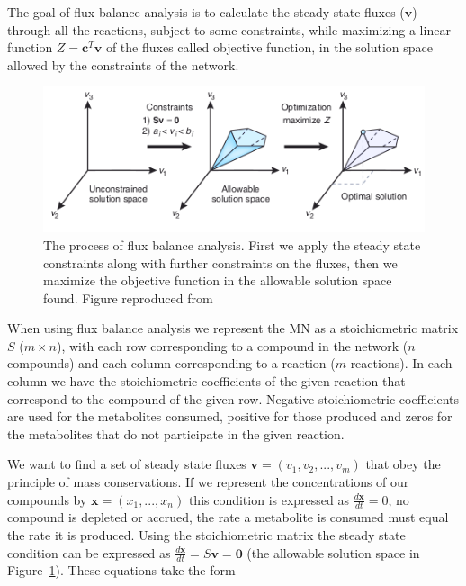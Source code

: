 \documentclass[a4paper,12pt]{article}
\begin{document}
	The goal of flux balance analysis is to calculate the steady state fluxes ($\mathbf{v}$) through all the reactions, subject to some constraints, while maximizing a linear function $Z=\mathbf{c}^T \mathbf{v}$ of the fluxes called objective function, in the solution space allowed by the constraints of the network.

	\begin{figure}[htpb]
		\centering
		\includegraphics[width=0.8\linewidth]{fba_frompaper.png}
		\caption{The process of flux balance analysis. First we apply the steady state constraints along with further constraints on the fluxes, then we maximize the objective function in the allowable solution space found. Figure reproduced from \cite[]{whatisfluxbalance} }
		\label{fig:fluxbalance}
	\end{figure}

	When using flux balance analysis we represent the MN as a stoichiometric matrix $S$ ($m\times n$), with each row corresponding to a compound in the network ($n$ compounds) and each column corresponding to a reaction ($m$ reactions). In each column we have the stoichiometric coefficients of the given reaction that correspond to the compound of the given row. Negative stoichiometric coefficients are used for the metabolites consumed, positive for those produced and zeros for the metabolites that do not participate in the given reaction.
	
	We want to find a set of steady state fluxes $\mathbf{v}=\left( v_1,v_2,...,v_m \right)$ that obey the principle of mass conservations. If we represent the concentrations of our compounds by ${\mathbf{x}=\left( x_1, ... , x_n \right)}$ this condition is expressed as $\frac{d\mathbf{x}}{dt}=0$, no compound is depleted or accrued, the rate a metabolite is consumed must equal the rate it is produced. Using the stoichiometric matrix the steady state condition can be expressed as $\frac{d\mathbf{x}}{dt}= S\mathbf{v}=\mathbf{0}$ (the allowable solution space in Figure~\ref{fig:fluxbalance}). These equations take the form
	
\end{document}
